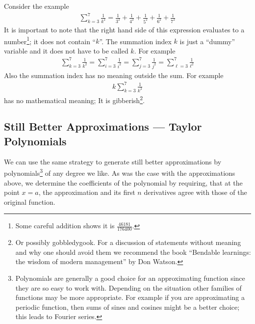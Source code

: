 Consider the example
\begin{align*}
\sum_{k=3}^7 \frac{1}{k^2}=\frac{1}{3^2}+\frac{1}{4^2}+\frac{1}{5^2}+
\frac{1}{6^2}+\frac{1}{7^2}
\end{align*}
It is important to note that the right hand side of this expression evaluates to a
number\footnote{Some careful addition shows it is $\frac{46181}{176400}$.}; it does not
contain ``$k$''.  The summation index $k$  is just a ``dummy'' variable and
it does not have to be called $k$. For example
\begin{align*}
  \sum_{k=3}^7 \frac{1}{k^2}
  =\sum_{i=3}^7 \frac{1}{i^2}
  =\sum_{j=3}^7 \frac{1}{j^2}
  =\sum_{\ell=3}^7 \frac{1}{\ell^2}
\end{align*}
Also the summation index has no meaning outside the sum. For
example
\begin{align*}
k\sum_{k=3}^7 \frac{1}{k^2}
\end{align*}
has no mathematical meaning; It is gibberish\footnote{Or possibly gobbledygook. For a
discussion of statements without meaning and why one should avoid them we recommend the
book ``Bendable learnings: the wisdom of modern management'' by Don Watson.}.



\subsection{Still Better Approximations --- Taylor Polynomials}
We can use the same strategy to generate still better approximations by
polynomials\footnote{Polynomials are generally a good choice for an approximating
function since they are so easy to work with. Depending on the situation other families
of functions may be more appropriate. For example if you are approximating a periodic
function, then sums of sines and cosines might be a better choice; this leads to Fourier
series.} of any degree we like. As was the case with the approximations above, we
determine the coefficients of the polynomial by requiring, that at the point
$x=a$, the approximation and its first $n$ derivatives agree with those of the
original function.

